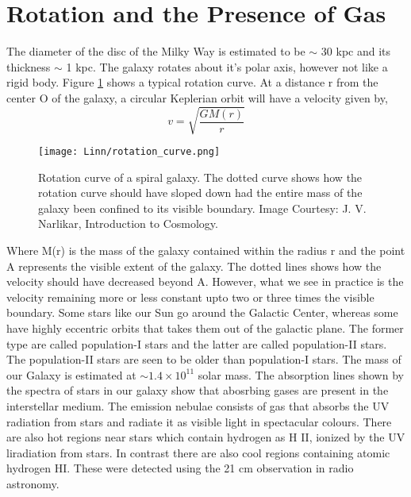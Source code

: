 \documentclass{../template/texnote}
\begin{document}
\section{Rotation and the Presence of Gas}
The diameter of the disc of the Milky Way is estimated to be $\sim$ 30 kpc and its thickness $\sim$ 1 kpc.
The galaxy rotates about it's polar axis, however not like a rigid body.
Figure \ref{fig:rotation} shows a typical rotation curve.
At a distance r from the center O of the galaxy, a circular Keplerian orbit will have a velocity given by,
$$ v = \sqrt{\frac{GM(r)}{r}} $$
	\begin{figure}
	\begin{center}
		\texttt{[image: Linn/rotation\_curve.png]}
	\end{center}
	\caption{Rotation curve of a spiral galaxy. The dotted curve shows how the rotation curve should have sloped down had the entire mass of the galaxy  been confined to its visible boundary. Image Courtesy: J. V. Narlikar, Introduction to Cosmology.}
	\label{fig:rotation}
	\end{figure}
Where M(r) is the mass of the galaxy contained within the radius r and the point A represents the visible extent of the galaxy.
The dotted lines shows how the velocity should have decreased beyond A. However, what we see in practice is the velocity remaining more or less constant upto two or three times the visible boundary.
Some stars like our Sun go around the Galactic Center, whereas some have highly eccentric orbits that takes them out of the galactic plane.
The former type are called population-I stars and the latter are called population-II stars.
The population-II stars are seen to be older than population-I stars.
The mass of our Galaxy is estimated at $\sim 1.4 \times 10 ^{11}$ solar mass.
The absorption lines shown by the spectra of stars in our galaxy show that abosrbing gases are present in the interstellar medium.
The emission nebulae consists of gas that absorbs the UV radiation from stars and radiate it as visible light in spectacular colours.
There are also hot regions near stars which contain hydrogen as H II, ionized by the UV liradiation from stars.
In contrast there are also cool regions containing atomic hydrogen HI.
These were detected using the 21 cm observation in radio astronomy.

\end{document}
